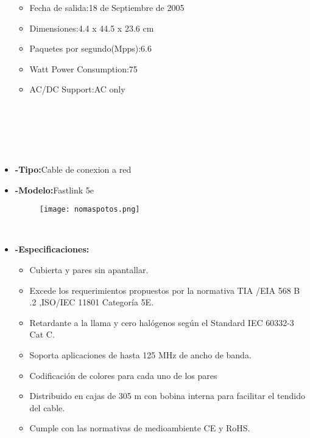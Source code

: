 \documentclass{udpreport}
\begin{document}
\begin{itemize}
\begin{itemize}
			\item Fecha de salida:18 de Septiembre de 2005\\
			\item Dimensiones:4.4 x 44.5 x 23.6 cm\\
			\item Paquetes por segundo(Mpps):6.6\\
			\item Watt Power Consumption:75\\
			\item AC/DC Support:AC only\\ \\ \\ \\ \\ \\
		\end{itemize}
		\item{\bf-Tipo:}Cable de conexion a red\\
		\item{\bf-Modelo:}Fastlink 5e\\
		\begin{figure}[h]
    		\centering
    	\texttt{[image: nomaspotos.png]}
		\end{figure}\\
		\item{\bf-Especificaciones:}
		\begin{itemize}
			\item Cubierta y pares sin apantallar.\\
			\item Excede los requerimientos propuestos por la normativa TIA /EIA 568 B .2 ,ISO/IEC 11801 Categoría 5E.\\
			\item Retardante a la llama y cero halógenos según el Standard IEC 60332-3 Cat C.\\
			\item Soporta aplicaciones de hasta 125 MHz de ancho de banda.\\
			\item Codificación de colores para cada uno de los pares\\
			\item Distribuido en cajas de 305 m con bobina interna para facilitar el tendido del cable.\\
			\item Cumple con las normativas de medioambiente CE y RoHS.\\
		\end{itemize}

\end{itemize}
\end{document}
